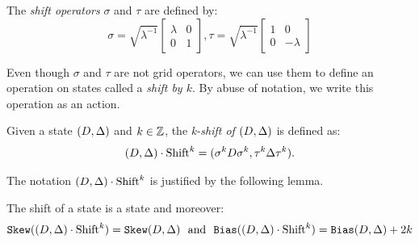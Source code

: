 \begin{definition}
The \emph{shift operators} $\sigma$ and $\tau$ are defined by:
\[
\sigma =
\sqrt{\lambda^{-1}}\left[\begin{array}{cc}
\lambda & 0 \\
0 & 1
\end{array} \right],
\tau =
\sqrt{\lambda^{-1}}
\left[\begin{array}{cc}
1 & 0 \\
0 & -\lambda
\end{array} \right]
\]
\end{definition}

Even though $\sigma$ and $\tau$ are not grid operators, we can use 
them to define an operation on states called a \emph{shift by $k$}. 
By abuse of notation, we write this operation as an action.

\begin{definition}
Given a state $(D,\Delta)$ and $k\in\mathbb{Z}$, the \emph{k-shift of $(D,\Delta)$} is defined as:
\[
(D,\Delta) \cdot \mbox{Shift}^k = (\sigma^k D \sigma^k, \tau^k \Delta \tau^k).
\]
\end{definition}

The notation $(D,\Delta) \cdot \mbox{Shift}^k$ is justified by the following lemma.

\begin{lemma}
\label{propshift}
The shift of a state is a state and moreover:
\[
\mathtt{Skew}((D,\Delta)\cdot\mbox{Shift}^k)= \mathtt{Skew}(D,\Delta)
~\mbox{ and }~
\mathtt{Bias}((D,\Delta)\cdot\mbox{Shift}^k)=\mathtt{Bias}(D,\Delta) +2k
\]
\end{lemma}

